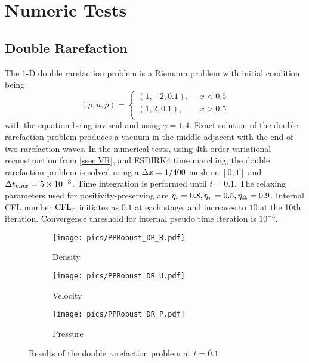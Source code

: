 \section{Numeric Tests}

\subsection{Double Rarefaction}

The 1-D double rarefaction problem \cite{hu2004kineticDoubleRare} 
is a Riemann problem with initial condition being
\begin{equation}
    (\rho,u,p) = \left\{
        \begin{array}{ll}
            (1,-2,0.1),\ \ & x < 0.5\\
            (1,2,0.1),\ \ & x > 0.5\\
        \end{array}
    \right.
\end{equation}
with the equation being inviscid and using $\gamma=1.4$.
Exact solution of the double rarefaction problem produces a vacuum 
in the middle adjacent with the end of two rarefaction waves.
In the numerical tests, using 4th order variational reconstruction from \ref{ssec:VR},
and ESDIRK4 time marching, 
the double rarefaction problem is solved using a $\mathrm\Delta x = 1/400$ mesh 
on $[0,1]$ and $\mathrm\Delta t_{max} = 5\times 10^{-3}$. 
Time integration is performed until $t=0.1$.
 The relaxing parameters used 
for positivity-preserving are $\eta_t= 0.8, \eta_\tau=0.5, \eta_\mathrm\Delta=0.9$.
Internal CFL number $\text{CFL}_\tau$ initiates as $0.1$ at each stage, and 
increases to $10$ at the 10th iteration. 
Convergence threshold for internal pseudo time iteration is $10^{-3}$. 

\begin{figure}[htbp]
    \centering
    \begin{subfigure}{0.33\textwidth}
        \texttt{[image: pics/PPRobust\_DR\_R.pdf]}
        \caption[]{Density}
    \end{subfigure}\hfill
    \begin{subfigure}{0.33\textwidth}
        \texttt{[image: pics/PPRobust\_DR\_U.pdf]}
        \caption[]{Velocity}
    \end{subfigure}\hfill
    \begin{subfigure}{0.33\textwidth}
        \texttt{[image: pics/PPRobust\_DR\_P.pdf]}
        \caption[]{Pressure}
    \end{subfigure}
    \caption{Results of the double rarefaction problem at $t=0.1$}
    \label{fig:doubleRare}
\end{figure}

